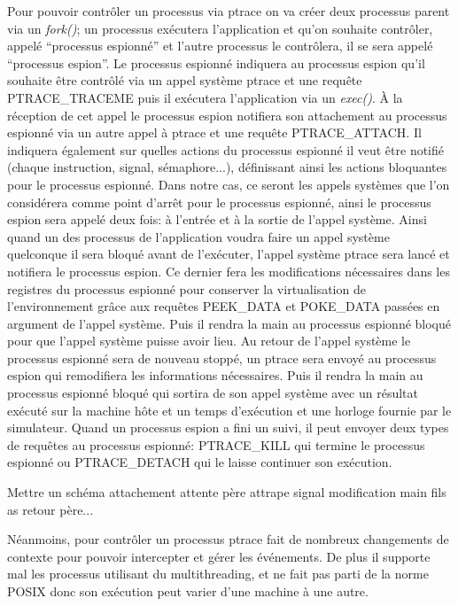 Pour pouvoir contrôler un processus via ptrace on va créer deux processus parent
via un \textit{fork()}; un processus exécutera l'application et qu'on souhaite
contrôler, appelé ``processus espionné'' et l'autre processus le contrôlera, il
se sera appelé ``processus espion''. Le processus espionné indiquera au
processus espion qu'il souhaite être contrôlé via un appel système ptrace et une
requête PTRACE\_TRACEME puis il exécutera l'application via un
\textit{exec()}. À la réception de cet appel le processus espion notifiera son
attachement au processus espionné via un autre appel à ptrace et une requête
PTRACE\_ATTACH. Il indiquera également sur quelles actions du processus espionné
il veut être notifié (chaque instruction, signal, sémaphore...), définissant
ainsi les actions bloquantes pour le processus espionné. Dans notre cas, ce
seront les appels systèmes que l'on considérera comme point d'arrêt pour le
processus espionné, ainsi le processus espion sera appelé deux fois: à l'entrée
et à la sortie de l'appel système. Ainsi quand un des processus de l'application
voudra faire un appel système quelconque il sera bloqué avant de l'exécuter,
l'appel système ptrace sera lancé et notifiera le processus espion. Ce dernier
fera les modifications nécessaires dans les registres du processus espionné pour
conserver la virtualisation de l'environnement grâce aux requêtes PEEK\_DATA et
POKE\_DATA passées en argument de l'appel système. Puis il rendra la main au
processus espionné bloqué pour que l'appel système puisse avoir lieu. Au retour
de l'appel système le processus espionné sera de nouveau stoppé, un ptrace sera
envoyé au processus espion qui remodifiera les informations nécessaires. Puis il
rendra la main au processus espionné bloqué qui sortira de son appel système
avec un résultat exécuté sur la machine hôte et un temps d'exécution et une
horloge fournie par le simulateur. Quand un processus espion a fini un suivi, il
peut envoyer deux types de requêtes au processus espionné: PTRACE\_KILL qui
termine le processus espionné ou PTRACE\_DETACH qui le laisse continuer son
exécution.

{\color{red} Mettre un schéma attachement attente père attrape signal
  modification main fils as retour père...}

Néanmoins, pour contrôler un processus ptrace fait de nombreux changements de
contexte pour pouvoir intercepter et gérer les événements. De plus il supporte
mal les processus utilisant du multithreading, et ne fait pas parti de la norme
POSIX donc son exécution peut varier d'une machine à une autre.

